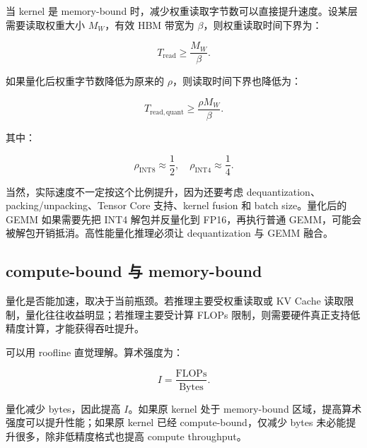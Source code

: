 当 kernel 是 memory-bound 时，减少权重读取字节数可以直接提升速度。设某层需要读取权重大小 $M_W$，有效 HBM 带宽为 $\beta$，则权重读取时间下界为：

\[
T_{\mathrm{read}}
\ge
\frac{M_W}{\beta}.
\]

如果量化后权重字节数降低为原来的 $\rho$，则读取时间下界也降低为：

\[
T_{\mathrm{read,quant}}
\ge
\frac{\rho M_W}{\beta}.
\]

其中：

\[
\rho_{\mathrm{INT8}}\approx \frac{1}{2},
\quad
\rho_{\mathrm{INT4}}\approx \frac{1}{4}.
\]

当然，实际速度不一定按这个比例提升，因为还要考虑 dequantization、packing/unpacking、Tensor Core 支持、kernel fusion 和 batch size。量化后的 GEMM 如果需要先把 INT4 解包并反量化到 FP16，再执行普通 GEMM，可能会被解包开销抵消。高性能量化推理必须让 dequantization 与 GEMM 融合。

\subsection{compute-bound 与 memory-bound}
\label{subsec:compute-bound-memory-bound-quantization}

量化是否能加速，取决于当前瓶颈。若推理主要受权重读取或 KV Cache 读取限制，量化往往收益明显；若推理主要受计算 FLOPs 限制，则需要硬件真正支持低精度计算，才能获得吞吐提升。

可以用 roofline 直觉理解。算术强度为：

\[
I=\frac{\mathrm{FLOPs}}{\mathrm{Bytes}}.
\]

量化减少 bytes，因此提高 $I$。如果原 kernel 处于 memory-bound 区域，提高算术强度可以提升性能；如果原 kernel 已经 compute-bound，仅减少 bytes 未必能提升很多，除非低精度格式也提高 compute throughput。

